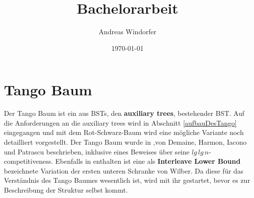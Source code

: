 \documentclass[a4paper,12pt]{article}
\title{Bachelorarbeit}
\author{
Andreas Windorfer\\
}
\date{\today}
\begin{document}
\maketitle
\newpage

\tableofcontents
\newpage

\section{Tango Baum}
Der Tango Baum ist ein aus BSTs, den \textbf{auxiliary trees}, bestehender BST. Auf die Anforderungen an die auxiliary trees wird in Abschnitt \ref{aufbauDesTango} eingegangen und mit dem Rot-Schwarz-Baum wird eine mögliche Variante noch detailliert vorgestellt. Der Tango Baum wurde in \cite{demainDinamicOpti},von Demaine, Harmon, Iacono und Patrascu beschrieben, inklusive eines Beweises über seine $\mathit{lg} \, \mathit{lg} \, n $-competitiveness. Ebenfalls in \cite{demainDinamicOpti} enthalten ist eine als \textbf{Interleave Lower Bound} bezeichnete Variation der ersten unteren Schranke von Wilber. Da diese für das Verständnis des Tango Baumes wesentlich ist, wird mit ihr gestartet, bevor es zur Beschreibung der Struktur selbst kommt. 
\end{document}
